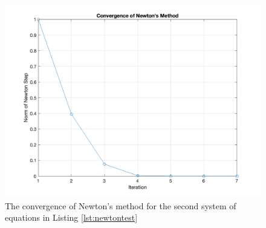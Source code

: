 \documentclass[11pt]{article}
\begin{document}
\begin{figure}[h]
  \centering
  \includegraphics[width=\textwidth]{newtonplot.png}
  \caption{The convergence of Newton's method for the second system of equations in Listing \ref{lst:newtontest}}
  \label{fig:newtonplot}
\end{figure}
\end{document}
